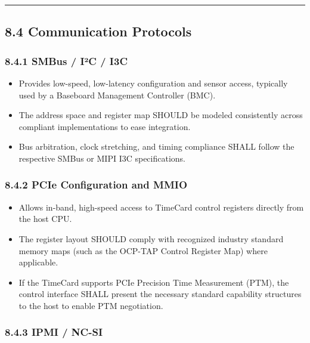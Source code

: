 \begin{center}\rule{0.5\linewidth}{0.5pt}\end{center}

\subsection{8.4 Communication Protocols}\label{communication-protocols}

\subsubsection{8.4.1 SMBus / I²C / I3C}\label{smbus-iuxb2c-i3c}

\begin{itemize}
\tightlist
\item
  Provides low-speed, low-latency configuration and sensor access,
  typically used by a Baseboard Management Controller (BMC).
\item
  The address space and register map SHOULD be modeled consistently
  across compliant implementations to ease integration.
\item
  Bus arbitration, clock stretching, and timing compliance SHALL follow
  the respective SMBus or MIPI I3C specifications.
\end{itemize}

\subsubsection{8.4.2 PCIe Configuration and
MMIO}\label{pcie-configuration-and-mmio}

\begin{itemize}
\tightlist
\item
  Allows in-band, high-speed access to TimeCard control registers
  directly from the host CPU.
\item
  The register layout SHOULD comply with recognized industry standard
  memory maps (such as the OCP-TAP Control Register Map) where
  applicable.
\item
  If the TimeCard supports PCIe Precision Time Measurement (PTM), the
  control interface SHALL present the necessary standard capability
  structures to the host to enable PTM negotiation.
\end{itemize}

\subsubsection{8.4.3 IPMI / NC-SI}\label{ipmi-nc-si}

